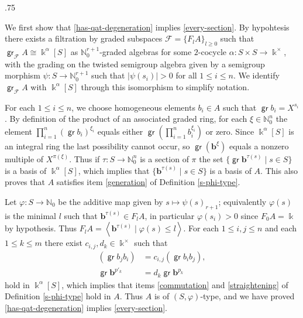 \documentclass[11pt,fleqn]{article}
\makeatletter
\renewenvironment{proof}[1][\textit{Proof}]{\par
  \pushQED{\qed}%
  \normalfont \topsep.75\paraskip\relax
  \trivlist
  \item[\hskip\labelsep
        \itshape
    #1\@addpunct{.}]\ignorespaces
}{%
  \popQED\endtrivlist\@endpefalse
}
\newcommand\NN{\mathbb N}
\renewcommand\to{\longrightarrow}
\renewcommand\phi{\varphi}
\newcommand\vspan[1]{\left\langle #1 \right\rangle}
\newcommand\F{\mathcal F}
\renewcommand\b{\mathbf b}
\renewcommand\k{\Bbbk}
\DeclareMathOperator\gr{\mathsf{gr}}
\makeatother
\begin{document}
\begin{proof}
We first show that \ref{has-qat-degeneration} implies \ref{every-section}. By hypohtesis
there exists a filtration by graded subspaces $\F = \{F_lA\}_{l \geq 0}$ such that 
$\gr_\F A \cong \k^\alpha[S]$ as $\NN_0^{r+1}$-graded algebras for some $2$-cocycle 
$\alpha: S \times S \to \k^\times$, with the grading on the twisted semigroup algebra 
given by a semigroup morphism $\psi: S \to \NN_0^{r+1}$ such that $|\psi(s_i)| > 0$ for 
all $1 \leq i \leq n$. We identify $\gr_\F A$ with $\k^\alpha[S]$ through this 
isomorphism to simplify notation. 

For each $1 \leq i \leq n$, we choose homogeneous elements $b_i \in A$ such that 
$\gr b_i = X^{s_i}$. By definition of the product of an associated graded ring, for each 
$\xi \in \NN_0^n$ the element $\prod_{i = 1}^n (\gr b_i)^{\xi_i}$ equals either 
$\gr \left(\prod_{i = 1}^n b_i^{\xi_i}\right)$ or zero. Since $\k^\alpha[S]$ is an
integral ring the last possibility cannot occur, so $\gr (\b^\xi)$ equals a nonzero 
multiple of $X^{\pi(\xi)}$. Thus if $\tau: S \to \NN_0^n$ is a section of $\pi$ the set 
$\{\gr \b^{\tau(s)} \mid s \in S\}$ is a basis of $\k^\alpha[S]$, which implies that 
$\{\b^{\tau(s)} \mid s \in S\}$ is a basis of $A$. This also proves that $A$ satisfies 
item \ref{generation} of Definition \ref{s-phi-type}.

Let $\phi: S \to \NN_0$ be the additive map given by $s \mapsto \psi(s)_{r+1}$; equivalently $\phi(s)$ is the minimal $l$ such that $\b^{\tau(s)} \in F_lA$, in particular $\phi(s_i) > 0$ since $F_0A = \k$ by hypothesis. Thus $F_lA = \vspan{
\b^{\tau(s)} \mid \phi(s) \leq l}$. For each $1 \leq i,j \leq n$
and each $1 \leq k \leq m$ there exist $c_{i,j}, d_k \in \k^\times$ such that
\begin{align*}
	(\gr b_j b_i) &= c_{i,j} (\gr b_i b_j),\\
	\gr \b^{p'_k} &= d_k \gr \b^{p_k}
\end{align*}
hold in $\k^\alpha[S]$, which implies that items \ref{commutation} and 
\ref{straightening} of Definition \ref{s-phi-type} hold in $A$. Thus $A$ is of
$(S,\phi)$-type, and we have proved \ref{has-qat-degeneration} implies 
\ref{every-section}.


\end{proof}
\end{document}
